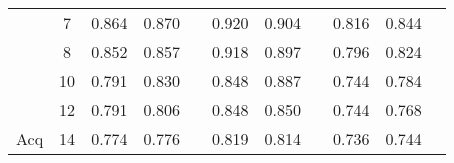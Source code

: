 \begin{table}[]
\begin{tabular}{|c|c|l|l|l|l|l|l|l|l|l|}
                       & 7                     & \cellcolor[HTML]{EFEFEF}0.864          & \cellcolor[HTML]{EFEFEF}0.870		 & \cellcolor[HTML]{EFEFEF}      & 0.920    & 0.904    &          & \cellcolor[HTML]{EFEFEF}0.816 & \cellcolor[HTML]{EFEFEF}0.844 & \cellcolor[HTML]{EFEFEF}      \\ \cline{2-11} 
                       & 8                     & \cellcolor[HTML]{EFEFEF}0.852          & \cellcolor[HTML]{EFEFEF}0.857          & \cellcolor[HTML]{EFEFEF}      & 0.918    & 0.897    &          & \cellcolor[HTML]{EFEFEF}0.796 & \cellcolor[HTML]{EFEFEF}0.824 & \cellcolor[HTML]{EFEFEF}      \\ \cline{2-11} 
                       & 10                    & \cellcolor[HTML]{EFEFEF}0.791          & \cellcolor[HTML]{EFEFEF}0.830          & \cellcolor[HTML]{EFEFEF}      & 0.848    & 0.887    &          & \cellcolor[HTML]{EFEFEF}0.744 & \cellcolor[HTML]{EFEFEF}0.784 & \cellcolor[HTML]{EFEFEF}      \\ \cline{2-11} 
                       & 12                    & \cellcolor[HTML]{EFEFEF}0.791          & \cellcolor[HTML]{EFEFEF}0.806          & \cellcolor[HTML]{EFEFEF}      & 0.848    & 0.850    &          & \cellcolor[HTML]{EFEFEF}0.744 & \cellcolor[HTML]{EFEFEF}0.768 & \cellcolor[HTML]{EFEFEF}      \\ \cline{2-11} 
\multirow{-9}{*}{Acq}  & 14                    & \cellcolor[HTML]{EFEFEF}0.774          & \cellcolor[HTML]{EFEFEF}0.776          & \cellcolor[HTML]{EFEFEF}      & 0.819    & 0.814    &          & \cellcolor[HTML]{EFEFEF}0.736 & \cellcolor[HTML]{EFEFEF}0.744 & \cellcolor[HTML]{EFEFEF}      \\ \hline
\end{tabular}
\end{table}
